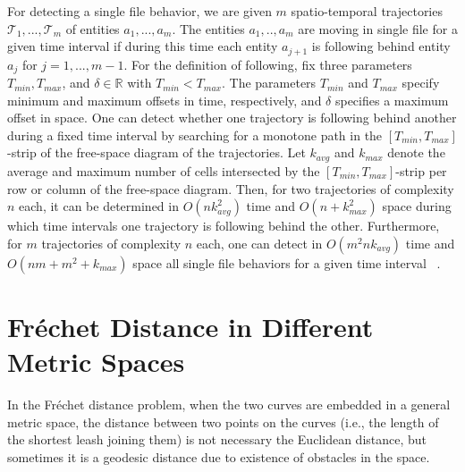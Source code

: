 \documentclass[12pt]{dalthesis}
\newcommand{\IR}{\ensuremath{\mathbb{R}}}
\newcommand{\CT}{{\mathscr T}}
\newcommand{\Frechet}{Fr\'echet }
\begin{document}
For detecting a single file behavior, we are given $m$ spatio-temporal trajectories
$\CT_1,..., \CT_m$ of entities $a_1,..., a_m$.
The entities $a_1,.., a_m$ are moving in single
file for a given time interval if during this time each entity
$a_{j+1}$ is following behind entity $a_j$ for $j=1,...,m-1$.
For the definition of following, fix three parameters
$T_{min}, T_{max}$, and $\delta \in \IR$ with $T_{min}<T_{max}$. The parameters
$T_{min}$ and $T_{max}$ specify minimum and maximum offsets in time, 
respectively, 
and $\delta$ specifies a maximum offset in space. 
One can detect whether one trajectory
is following behind another during a fixed time interval by
searching for a monotone path in the $[T_{min}, T_{max}]$-strip of
the free-space diagram of the trajectories. Let $k_{avg}$
and $k_{max}$ denote the average and maximum number of
cells intersected by the $[T_{min}, T_{max}]$-strip per row or column
of the free-space diagram. Then, for two trajectories of 
complexity $n$ each, it can be determined in $O(nk^2_{avg})$ time 
and $O(n + k_{max}^2)$ space during which time intervals one 
trajectory is following behind the other. 
Furthermore, for $m$ trajectories of complexity $n$ each, one can detect in $O(m^2nk_{avg})$ 
time and $O(nm+m^2 +k_{max})$ space all single file behaviors for a given time interval~\cite{Cons-Free} .

























\section{\Frechet Distance in Different Metric Spaces}

In the \Frechet distance problem,
when the two curves are embedded in a general metric space, 
the distance between two points on the curves 
(i.e., the length of the shortest leash joining them) 
is not necessary the Euclidean distance, but sometimes it is a geodesic distance
due to existence of obstacles in the space.
\end{document}
